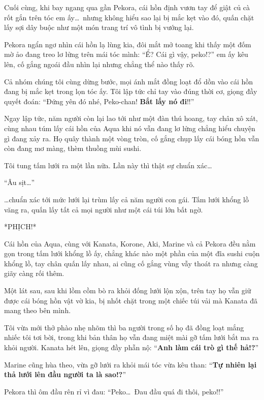 \documentclass[../main.tex]{subfiles}
\begin{document}

Cuối cùng, khi bay ngang qua gần Pekora, cái hồn định vươn tay để giật củ cà rốt gắn trên tóc em ấy\dots\ nhưng không hiểu sao lại bị mắc kẹt vào đó, quấn chặt lấy sợi dây buộc như một món trang trí vô tình bị vướng lại.

Pekora ngẩn ngơ nhìn cái hồn lạ lùng kia, đôi mắt mở toang khi thấy một đốm mờ ảo đang treo lơ lửng trên mái tóc mình: ``Ể? Cái gì vậy, peko!?'' em ấy kêu lên, cố gắng ngoái đầu nhìn lại nhưng chẳng thể nào thấy rõ.


Cả nhóm chúng tôi cùng dừng bước, mọi ánh mắt đồng loạt đổ dồn vào cái hồn đang bị mắc kẹt trong lọn tóc ấy. Tôi lập tức chỉ tay vào đúng thời cơ, giọng đầy quyết đoán: ``Đứng yên đó nhé, Peko-chan! \textbf{Bắt lấy nó đi}!!''

Ngay lập tức, năm người còn lại lao tới như một đàn thú hoang, tay chân xô xát, cùng nhau túm lấy cái hồn của Aqua khi nó vẫn đang lơ lửng chẳng hiểu chuyện gì đang xảy ra. Họ quây thành một vòng tròn, cố gắng chụp lấy cái bóng hồn vẫn còn đang mơ màng, thèm thuồng mùi sushi.

Tôi tung tấm lưới ra một lần nữa. Lần này thì thật sự chuẩn xác\dots

``Âu sịt\dots''

\dots chuẩn xác tới mức lưới lại trùm lấy cả năm người con gái. Tấm lưới khổng lồ văng ra, quấn lấy tất cả mọi người như một cái túi lớn bất ngờ.

*PHỊCH!*

Cái hồn của Aqua, cùng với Kanata, Korone, Aki, Marine và cả Pekora đều nằm gọn trong tấm lưới khổng lồ ấy, chẳng khác nào một phần của một đĩa sushi cuộn khổng lồ, tay chân quấn lấy nhau, ai cũng cố gắng vùng vẫy thoát ra nhưng càng giãy càng rối thêm.

Một lát sau, sau khi lồm cồm bò ra khỏi đống lưới lộn xộn, trên tay họ vẫn giữ được cái bóng hồn vật vờ kia, bị nhốt chặt trong một chiếc túi vải mà Kanata đã mang theo bên mình.

Tôi vừa mới thở phào nhẹ nhõm thì ba người trong số họ đã đồng loạt mắng nhiếc tôi tơi bời, trong khi bản thân họ vẫn đang miệt mài gỡ tấm lưới bắt ma ra khỏi người. Kanata hét lên, giọng đầy phẫn nộ: ``\textbf{Anh làm cái trò gì thế hả!?}''

Marine cũng hùa theo, vừa gỡ lưới ra khỏi mái tóc vừa kêu than: ``\textbf{Tự nhiên lại thả lưới lên đầu người ta là sao!?}''

Pekora thì ôm đầu rên rỉ vì đau: ``Peko\dots\ Đau đầu quá đi thôi, peko!!''
\end{document}
